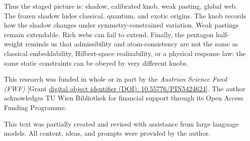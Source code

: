 \documentclass[aps,pra,reprint,superscriptaddress,nofootinbib,floatfix]{revtex4-2}
\begin{document}
Thus the staged picture is: shadow, calibrated knob, weak pasting, global
web.  The frozen shadow hides classical, quantum, and exotic origins.  The
knob records how the shadow changes under symmetry-constrained variation.
Weak pastings remain extendable.  Rich webs can fail to extend.  Finally, the
pentagon half-weight reminds us that admissibility and atom-consistency are
not the same as classical embeddability, Hilbert-space realizability, or a
physical response law: the same static constraints can be obeyed by very
different knobs.

\begin{acknowledgments}
This research was funded in whole or in part by the
\textit{Austrian Science Fund (FWF)}
[Grant
\href{https://doi.org/10.55776/PIN5424624}
{digital object identifier (DOI): 10.55776/PIN5424624}].
The author acknowledges TU Wien Bibliothek for financial support through its
Open Access Funding Programme.

This text was partially created and revised with assistance from large
language models.  All content, ideas, and prompts were provided by the author.
\end{acknowledgments}


\end{document}

